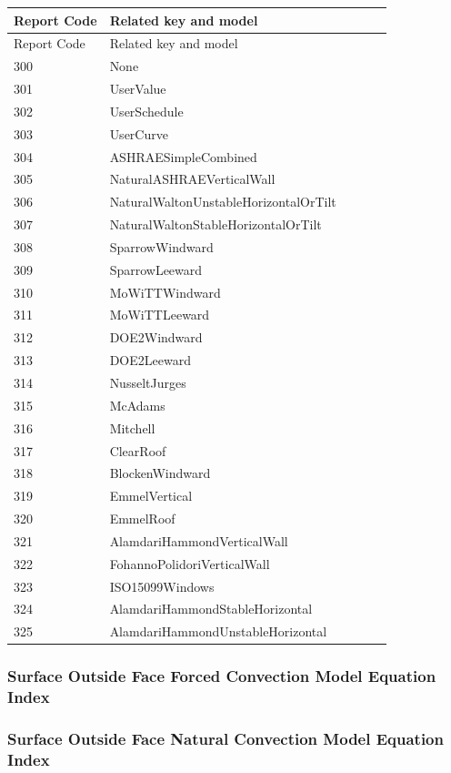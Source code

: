 \begin{longtable}[c]{@{}ll@{}}
\toprule 
Report Code & Related key and model \tabularnewline
\midrule
\endfirsthead

\toprule 
Report Code & Related key and model \tabularnewline
\midrule
\endhead

300 & None~ \tabularnewline
301 & UserValue \tabularnewline
302 & UserSchedule \tabularnewline
303 & UserCurve~~~~~~~~~~~~~~~~~~~~~~~~~~~~~~ \tabularnewline
304 & ASHRAESimpleCombined~~~~~~~~~~~~~~~~~~~ \tabularnewline
305 & NaturalASHRAEVerticalWall~~~~~~~~~~~~~~ \tabularnewline
306 & NaturalWaltonUnstableHorizontalOrTilt~~ \tabularnewline
307 & NaturalWaltonStableHorizontalOrTilt~~~~ \tabularnewline
308 & SparrowWindward~~~~~~~~~~~~~~~~~~~~~~~~ \tabularnewline
309 & SparrowLeeward~~~~~~~~~~~~~~~~~~~~~~~~~ \tabularnewline
310 & MoWiTTWindward~~~~~~~~~~~~~~~~~~~~~~~~~ \tabularnewline
311 & MoWiTTLeeward~~~~~~~~~~~~~~~~~~~~~~~~~~ \tabularnewline
312 & DOE2Windward~~~~~~~~~~~~~~~~~~~~~~~~~~~ \tabularnewline
313 & DOE2Leeward~~~~~~~~~~~~~~~~~~~~~~~~~~~~ \tabularnewline
314 & NusseltJurges~~~~~~~~~~~~~~~~~~~~~~~~~~ \tabularnewline
315 & McAdams~~~~~~~~~~~~~~~~~~~~~~~~~~~~~~~~ \tabularnewline
316 & Mitchell~~~~~~~~~~~~~~~~~~~~~~~~~~~~~~~ \tabularnewline
317 & ClearRoof~~~~~~~~~~~~~~~~~~~~~~~~~~~~~~ \tabularnewline
318 & BlockenWindward~~~~~~~~~~~~~~~~~~~~~~~~ \tabularnewline
319 & EmmelVertical~~~~~~~~~~~~ ~~~~~~~~~~~~~~ \tabularnewline
320 & EmmelRoof~~~~~~~~~~~~~~~~~~~~~~~~~~~~~~ \tabularnewline
321 & AlamdariHammondVerticalWall~~~~~~~~~~~~ \tabularnewline
322 & FohannoPolidoriVerticalWall~~~~~~~~~~~~ \tabularnewline
323 & ISO15099Windows~~~~~~~~~~~~~~~~~~~~~~~~ \tabularnewline
324 & AlamdariHammondStableHorizontal~~~~~~~~ \tabularnewline
325 & AlamdariHammondUnstableHorizontal~~~~~~ \tabularnewline
\bottomrule
\end{longtable}

\subsubsection{Surface Outside Face Forced Convection Model Equation Index}\label{surface-outside-face-forced-convection-model-equation-index}

\subsubsection{Surface Outside Face Natural Convection Model Equation Index}\label{surface-outside-face-natural-convection-model-equation-index}


